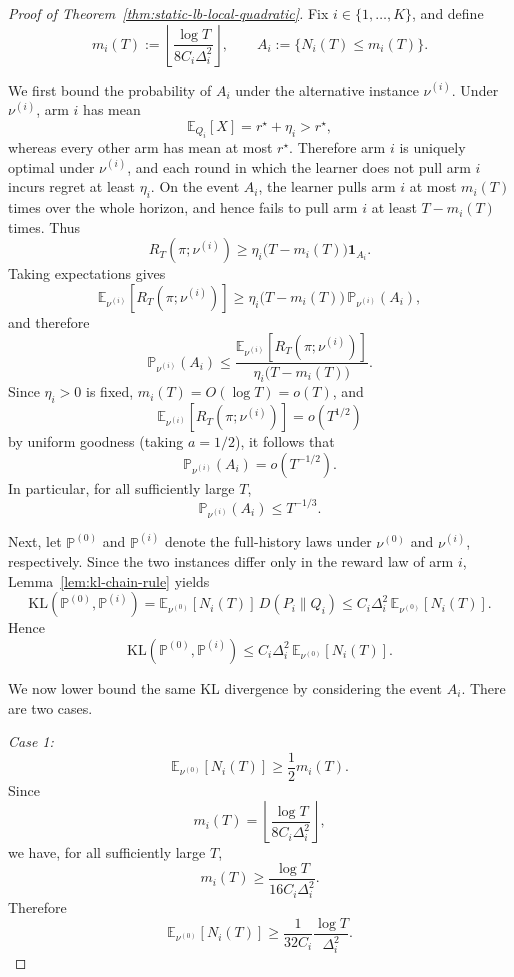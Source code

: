 \documentclass[11pt]{article}
\begin{document}
\begin{proof}[Proof of Theorem~\ref{thm:static-lb-local-quadratic}]
Fix $i\in\{1,\dots,K\}$, and define
\[
m_i(T):=\left\lfloor \frac{\log T}{8C_i\Delta_i^2}\right\rfloor,
\qquad
A_i:=\{N_i(T)\le m_i(T)\}.
\]

We first bound the probability of $A_i$ under the alternative instance
$\nu^{(i)}$. Under $\nu^{(i)}$, arm $i$ has mean
\[
\mathbb E_{Q_i}[X]=r^\star+\eta_i>r^\star,
\]
whereas every other arm has mean at most $r^\star$. Therefore arm $i$ is
uniquely optimal under $\nu^{(i)}$, and each round in which the learner does
not pull arm $i$ incurs regret at least $\eta_i$. On the event $A_i$, the
learner pulls arm $i$ at most $m_i(T)$ times over the whole horizon, and hence
fails to pull arm $i$ at least $T-m_i(T)$ times. Thus
\[
R_T(\pi;\nu^{(i)})
\ge
\eta_i\bigl(T-m_i(T)\bigr)\mathbf 1_{A_i}.
\]
Taking expectations gives
\[
\mathbb E_{\nu^{(i)}}[R_T(\pi;\nu^{(i)})]
\ge
\eta_i\bigl(T-m_i(T)\bigr)\,\mathbb P_{\nu^{(i)}}(A_i),
\]
and therefore
\[
\mathbb P_{\nu^{(i)}}(A_i)
\le
\frac{\mathbb E_{\nu^{(i)}}[R_T(\pi;\nu^{(i)})]}
{\eta_i\bigl(T-m_i(T)\bigr)}.
\]
Since $\eta_i>0$ is fixed, $m_i(T)=O(\log T)=o(T)$, and
\[
\mathbb E_{\nu^{(i)}}[R_T(\pi;\nu^{(i)})]=o(T^{1/2})
\]
by uniform goodness (taking $a=1/2$), it follows that
\[
\mathbb P_{\nu^{(i)}}(A_i)=o(T^{-1/2}).
\]
In particular, for all sufficiently large $T$,
\begin{equation}
\mathbb P_{\nu^{(i)}}(A_i)\le T^{-1/3}.
\label{eq:localquad-A1}
\end{equation}

Next, let $\mathbb P^{(0)}$ and $\mathbb P^{(i)}$ denote the full-history laws
under $\nu^{(0)}$ and $\nu^{(i)}$, respectively. Since the two instances
differ only in the reward law of arm $i$, Lemma~\ref{lem:kl-chain-rule} yields
\[
\mathrm{KL}(\mathbb P^{(0)},\mathbb P^{(i)})
=
\mathbb E_{\nu^{(0)}}[N_i(T)]\,D(P_i\|Q_i)
\le
C_i\Delta_i^2\,\mathbb E_{\nu^{(0)}}[N_i(T)].
\]
Hence
\begin{equation}
\mathrm{KL}(\mathbb P^{(0)},\mathbb P^{(i)})
\le
C_i\Delta_i^2\,\mathbb E_{\nu^{(0)}}[N_i(T)].
\label{eq:localquad-A2}
\end{equation}

We now lower bound the same KL divergence by considering the event $A_i$. There
are two cases.

\medskip
\noindent
\textit{Case 1:}
\[
\mathbb E_{\nu^{(0)}}[N_i(T)]\ge \frac12 m_i(T).
\]
Since
\[
m_i(T)=\left\lfloor \frac{\log T}{8C_i\Delta_i^2}\right\rfloor,
\]
we have, for all sufficiently large $T$,
\[
m_i(T)\ge \frac{\log T}{16C_i\Delta_i^2}.
\]
Therefore
\[
\mathbb E_{\nu^{(0)}}[N_i(T)]
\ge
\frac{1}{32C_i}\frac{\log T}{\Delta_i^2}.
\]


\end{proof}
\end{document}
